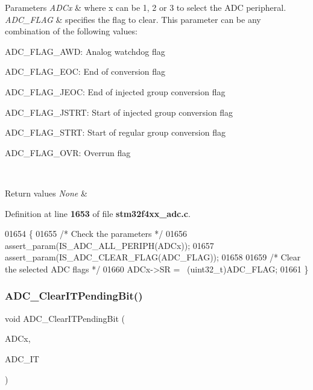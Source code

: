 \begin{DoxyParams}{Parameters}
{\em A\+D\+Cx} & where x can be 1, 2 or 3 to select the A\+DC peripheral. \\
\hline
{\em A\+D\+C\+\_\+\+F\+L\+AG} & specifies the flag to clear. This parameter can be any combination of the following values\+: \begin{DoxyItemize}
\item A\+D\+C\+\_\+\+F\+L\+A\+G\+\_\+\+A\+WD\+: Analog watchdog flag \item A\+D\+C\+\_\+\+F\+L\+A\+G\+\_\+\+E\+OC\+: End of conversion flag \item A\+D\+C\+\_\+\+F\+L\+A\+G\+\_\+\+J\+E\+OC\+: End of injected group conversion flag \item A\+D\+C\+\_\+\+F\+L\+A\+G\+\_\+\+J\+S\+T\+RT\+: Start of injected group conversion flag \item A\+D\+C\+\_\+\+F\+L\+A\+G\+\_\+\+S\+T\+RT\+: Start of regular group conversion flag \item A\+D\+C\+\_\+\+F\+L\+A\+G\+\_\+\+O\+VR\+: Overrun flag \end{DoxyItemize}
\\
\hline
\end{DoxyParams}

\begin{DoxyRetVals}{Return values}
{\em None} & \\
\hline
\end{DoxyRetVals}


Definition at line \textbf{ 1653} of file \textbf{ stm32f4xx\+\_\+adc.\+c}.


\begin{DoxyCode}
01654 \{
01655   \textcolor{comment}{/* Check the parameters */}
01656   assert_param(IS_ADC_ALL_PERIPH(ADCx));
01657   assert_param(IS_ADC_CLEAR_FLAG(ADC\_FLAG));
01658 
01659   \textcolor{comment}{/* Clear the selected ADC flags */}
01660   ADCx->SR = ~(uint32\_t)ADC\_FLAG;
01661 \}
\end{DoxyCode}
\mbox{\label{group__ADC__Group7_ga601c6a67bd883eb631ecc7aa5e999b9c}} 
\subsubsection{A\+D\+C\+\_\+\+Clear\+I\+T\+Pending\+Bit()}
{\footnotesize\ttfamily void A\+D\+C\+\_\+\+Clear\+I\+T\+Pending\+Bit (\begin{DoxyParamCaption}\item[{\textbf{ A\+D\+C\+\_\+\+Type\+Def} $\ast$}]{A\+D\+Cx,  }\item[{uint16\+\_\+t}]{A\+D\+C\+\_\+\+IT }\end{DoxyParamCaption})}



